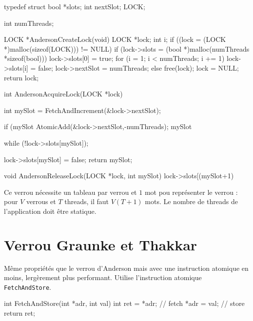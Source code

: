 \documentclass[11pt,a4paper]{report}
\begin{document}
\begin{ccode}
    typedef struct
    {
        bool *slots;
        int nextSlot;
    } LOCK;

    int numThreads;

    LOCK *AndersonCreateLock(void)
    {
        LOCK *lock;
        int i;
        if ((lock = (LOCK *)malloc(sizeof(LOCK))) != NULL)
            if (lock->slots = (bool *)malloc(numThreads *sizeof(bool)))
            {
                lock->slots[0] = true;
                for (i = 1; i < numThreads; i += 1)
                lock->slots[i] = false;
                lock->nextSlot = numThreads;
            }
            else
            {
                free(lock); lock = NULL;
            }
        return lock;
    }

    int AndersonAcquireLock(LOCK *lock)
    {
        int mySlot = FetchAndIncrement(&lock->nextSlot);

        if (mySlot %
            AtomicAdd(&lock->nextSlot,-numThreads);
        mySlot %

        while (!lock->slots[mySlot]);

        lock->slots[mySlot] = false;
        return mySlot;
    }

    void AndersonReleaseLock(LOCK *lock, int mySlot)
    {
        lock->slots[(mySlot+1) %
    }
\end{ccode}

Ce verrou nécessite un tableau par verrou et $1$ mot pou représenter le verrou : pour $V$ verrous et $T$ threads, il faut $V(T+1)$ mots. Le nombre de threads de l'application doit être statique.


\section{Verrou Graunke et Thakkar} %
\label{sec:Verrou Graunke et Thakkar}

Même propriétés que le verrou d'Anderson mais avec une instruction atomique en moins, lergèrement plus performant. Utilise l'instruction atomique \texttt{FetchAndStore}.

\begin{ccode}
    int FetchAndStore(int *adr, int val)
    {
        int ret = *adr;  // fetch
        *adr = val;      // store
        return ret;
    } 
\end{ccode}
\end{document}
